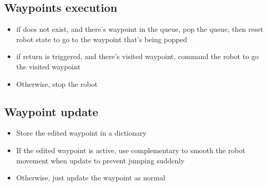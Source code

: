 \documentclass[letterpaper,10pt,english]{sphinxmanual}
\begin{document}
\subsection{Waypoints execution}
\label{\detokenize{technical_reference:waypoints-execution}}\begin{itemize}
\item {} 
\sphinxAtStartPar
if  does not exist, and there’s waypoint in the queue, pop the queue, then reset robot state to go to the waypoint that’s being popped

\item {} 
\sphinxAtStartPar
if return is triggered, and there’s visited waypoint, command the robot to go the visited waypoint

\item {} 
\sphinxAtStartPar
Otherwise, stop the robot

\end{itemize}


\subsection{Waypoint update}
\label{\detokenize{technical_reference:waypoint-update}}\begin{itemize}
\item {} 
\sphinxAtStartPar
Store the edited waypoint in a dictionary

\item {} 
\sphinxAtStartPar
If the edited waypoint is active, use complementary to smooth the robot movement when update to prevent jumping suddenly

\end{itemize}

\begin{sphinxVerbatim}[commandchars=\\\{\}]
\PYG{p}{[}\PYG{p}{]}      \PYG{p}{[}\PYG{p}{]}    \PYG{p}{[}\PYG{p}{]}
\PYG{p}{[}\PYG{p}{]}      \PYG{p}{[}\PYG{p}{]}    \PYG{p}{[}\PYG{p}{]}
\end{sphinxVerbatim}
\begin{itemize}
\item {} 
\sphinxAtStartPar
Otherwise, just update the waypoint as normal

\end{itemize}
\end{document}
